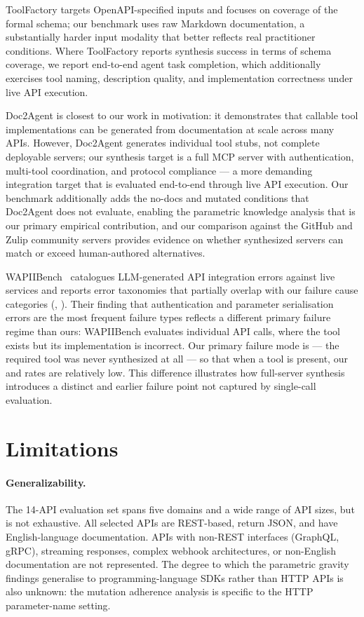ToolFactory targets OpenAPI-specified inputs and focuses on coverage of the formal schema; our benchmark uses raw Markdown documentation, a substantially harder input modality that better reflects real practitioner conditions. Where ToolFactory reports synthesis success in terms of schema coverage, we report end-to-end agent task completion, which additionally exercises tool naming, description quality, and implementation correctness under live API execution.

Doc2Agent is closest to our work in motivation: it demonstrates that callable tool implementations can be generated from documentation at scale across many APIs. However, Doc2Agent generates individual tool stubs, not complete deployable servers; our synthesis target is a full MCP server with authentication, multi-tool coordination, and protocol compliance --- a more demanding integration target that is evaluated end-to-end through live API execution. Our benchmark additionally adds the no-docs and mutated conditions that Doc2Agent does not evaluate, enabling the parametric knowledge analysis that is our primary empirical contribution, and our comparison against the GitHub and Zulip community servers provides evidence on whether synthesized servers can match or exceed human-authored alternatives.

WAPIIBench~\citep{wapiibench2025} catalogues LLM-generated API integration errors against live services and reports error taxonomies that partially overlap with our failure cause categories (, ). Their finding that authentication and parameter serialisation errors are the most frequent failure types reflects a different primary failure regime than ours: WAPIIBench evaluates individual API calls, where the tool exists but its implementation is incorrect. Our primary failure mode is  --- the required tool was never synthesized at all --- so that when a tool is present, our  and  rates are relatively low. This difference illustrates how full-server synthesis introduces a distinct and earlier failure point not captured by single-call evaluation.

\section{Limitations}
\label{sec:discussion-limitations}

\paragraph{Generalizability.}
The 14-API evaluation set spans five domains and a wide range of API sizes, but is not exhaustive. All selected APIs are REST-based, return JSON, and have English-language documentation. APIs with non-REST interfaces (GraphQL, gRPC), streaming responses, complex webhook architectures, or non-English documentation are not represented. The degree to which the parametric gravity findings generalise to programming-language SDKs rather than HTTP APIs is also unknown: the mutation adherence analysis is specific to the HTTP parameter-name setting.

